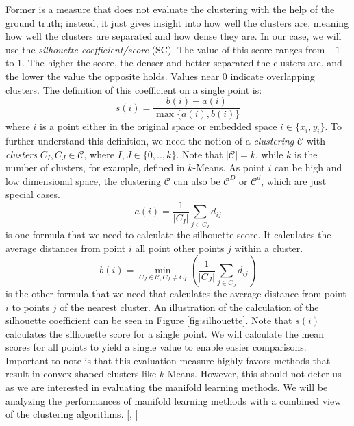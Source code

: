 Former is a measure that does not evaluate the clustering with the help of the ground truth; instead, it just gives insight into how well the clusters are, meaning how well the clusters are separated and how dense they are. In our case, we will use the \textit{silhouette coefficient/score} (SC). The value of this score ranges from $-1$ to $1$. The higher the score, the denser and better separated the clusters are, and the lower the value the opposite holds. Values near $0$ indicate overlapping clusters. The definition of this coefficient on a single point is:
\begin{equation}
    s(i)=\frac{b(i)-a(i)}{\max \{ a(i),b(i) \} }
\end{equation}
where $i$ is a point either in the original space or embedded space $i\in \{ x_i,y_i \}$. To further understand this definition, we need the notion of a \textit{clustering} $\mathcal{C}$ with \textit{clusters} $C_I, C_J \in \mathcal{C}$, where $I, J \in \{0,..,k\}$. Note that $|\mathcal{C}| = k$, while $k$ is the number of clusters, for example, defined in $k$-Means. As point $i$ can be high and low dimensional space, the clustering $\mathcal{C}$ can also be $\mathcal{C}^D$ or $\mathcal{C}^d$, which are just special cases.
\begin{equation}
    a(i)= \frac{1}{|C_I|} \sum_{j\in C_I} d_{ij}
\end{equation}
is one formula that we need to calculate the silhouette score. It calculates the average distances from point $i$ all point other points $j$ within a cluster.
\begin{equation}
    b(i)= \min_{C_J \in \mathcal{C}, C_J\neq C_I} (\frac{1}{|C_J|}\sum_{j\in C_J}d_{ij})
\end{equation}
is the other formula that we need that calculates the average distance from point $i$ to points $j$ of the nearest cluster. An illustration of the calculation of the silhouette coefficient can be seen in Figure \ref{fig:silhouette}. Note that $s(i)$ calculates the silhouette score for a single point. We will calculate the mean scores for all points to yield a single value to enable easier comparisons. Important to note is that this evaluation measure highly favors methods that result in convex-shaped clusters like $k$-Means. However, this should not deter us as we are interested in evaluating the manifold learning methods. We will be analyzing the performances of manifold learning methods with a combined view of the clustering algorithms. [\cite{silhouette}, \cite{sklearn_silhouette}]
